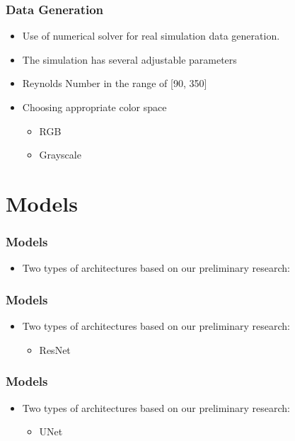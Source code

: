 \documentclass[18pt]{beamer}
\begin{document}
\begin{frame}[t]
  \frametitle{Data Generation}
  \begin{itemize}
  \item Use of numerical solver for real simulation data generation.
  \item The simulation has several adjustable parameters
  \item Reynolds Number in the range of [90, 350]
  \item Choosing appropriate color space
    \begin{itemize}
    \item RGB
    \item Grayscale
    \end{itemize}
  \end{itemize}
\end{frame}

\section{Models}
\begin{frame}[t]
  \frametitle{Models}
  \begin{itemize}
  \item Two types of architectures based on our preliminary research:
  \end{itemize}
\end{frame}


\begin{frame}[t]
  \frametitle{Models}
  \begin{itemize}
  \item Two types of architectures based on our preliminary research:
    \begin{itemize}
    \item ResNet 
    \end{itemize}
  \end{itemize}
\end{frame}


\begin{frame}[t]
  \frametitle{Models}
  \begin{itemize}
  \item Two types of architectures based on our preliminary research:
    \begin{itemize}
    \item UNet
    \end{itemize}
  \end{itemize}
\end{frame}
\end{document}
